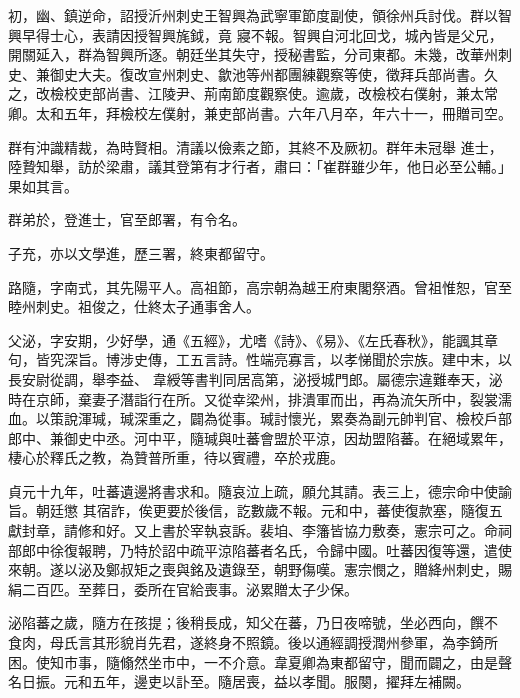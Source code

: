 \begin{pinyinscope}
 初，幽、鎮逆命，詔授沂州刺史王智興為武寧軍節度副使，領徐州兵討伐。群以智興早得士心，表請因授智興旄鉞，竟
 寢不報。智興自河北回戈，城內皆是父兄，開關延入，群為智興所逐。朝廷坐其失守，授秘書監，分司東都。未幾，改華州刺史、兼御史大夫。復改宣州刺史、歙池等州都團練觀察等使，徵拜兵部尚書。久之，改檢校吏部尚書、江陵尹、荊南節度觀察使。逾歲，改檢校右僕射，兼太常卿。太和五年，拜檢校左僕射，兼吏部尚書。六年八月卒，年六十一，冊贈司空。



 群有沖識精裁，為時賢相。清議以儉素之節，其終不及厥初。群年未冠舉
 進士，陸贄知舉，訪於梁肅，議其登第有才行者，肅曰：「崔群雖少年，他日必至公輔。」果如其言。



 群弟於，登進士，官至郎署，有令名。



 子充，亦以文學進，歷三署，終東都留守。



 路隨，字南式，其先陽平人。高祖節，高宗朝為越王府東閣祭酒。曾祖惟恕，官至睦州刺史。祖俊之，仕終太子通事舍人。



 父泌，字安期，少好學，通《五經》，尤嗜《詩》、《易》、《左氏春秋》，能諷其章句，皆究深旨。博涉史傳，工五言詩。性端亮寡言，以孝悌聞於宗族。建中末，以長安尉從調，舉李益、
 韋綬等書判同居高第，泌授城門郎。屬德宗違難奉天，泌時在京師，棄妻子潛詣行在所。又從幸梁州，排潰軍而出，再為流矢所中，裂裳濡血。以策說渾瑊，瑊深重之，闢為從事。瑊討懷光，累奏為副元帥判官、檢校戶部郎中、兼御史中丞。河中平，隨瑊與吐蕃會盟於平涼，因劫盟陷蕃。在絕域累年，棲心於釋氏之教，為贊普所重，待以賓禮，卒於戎鹿。



 貞元十九年，吐蕃遺邊將書求和。隨哀泣上疏，願允其請。表三上，德宗命中使諭旨。朝廷懲
 其宿詐，俟更要於後信，訖數歲不報。元和中，蕃使復款塞，隨復五獻封章，請修和好。又上書於宰執哀訴。裴垍、李籓皆協力敷奏，憲宗可之。命祠部郎中徐復報聘，乃特於詔中疏平涼陷蕃者名氏，令歸中國。吐蕃因復等還，遣使來朝。遂以泌及鄭叔矩之喪與銘及遺錄至，朝野傷嘆。憲宗憫之，贈絳州刺史，賜絹二百匹。至葬日，委所在官給喪事。泌累贈太子少保。



 泌陷蕃之歲，隨方在孩提；後稍長成，知父在蕃，乃日夜啼號，坐必西向，饌不
 食肉，母氏言其形貌肖先君，遂終身不照鏡。後以通經調授潤州參軍，為李錡所困。使知市事，隨翛然坐市中，一不介意。韋夏卿為東都留守，聞而闢之，由是聲名日振。元和五年，邊吏以訃至。隨居喪，益以孝聞。服闋，擢拜左補闕。




\end{pinyinscope}
